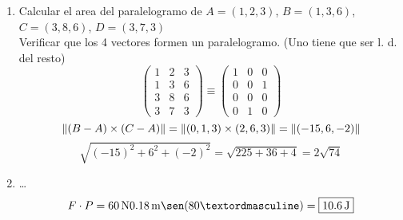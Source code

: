 \documentclass[../practica.root.tex]{subfiles}
\begin{document}
\begin{enumerate}
\begin{enumerate}
          \end{enumerate}

    \item Calcular el area del paralelogramo de $A = (1, 2, 3)$, $B = (1, 3, 6)$, $C = (3, 8, 6)$, $D = (3, 7 ,3)$ \\
          Verificar que los 4 vectores formen un paralelogramo. (Uno tiene que ser l. d. del resto) \\
          \[
              \begin{pmatrix}
                  1 & 2 & 3 \\
                  1 & 3 & 6 \\
                  3 & 8 & 6 \\
                  3 & 7 & 3
              \end{pmatrix}
              \equiv
              \begin{pmatrix}
                  1 & 0 & 0 \\
                  0 & 0 & 1 \\
                  0 & 0 & 0 \\
                  0 & 1 & 0
              \end{pmatrix}
          \]
          \[
              \|(B-A)\times(C-A)\| = \|(0, 1, 3)\times(2, 6, 3)\| = \|(-15, 6, -2)\|
          \] \[
              \sqrt{(-15)^2 + 6^2 + (-2)^2} = \sqrt{225 + 36 + 4} = \boxed{2\sqrt{74}}
          \]

    \item \dots
          \[F \cdot P = \SI{60}{\newton}\SI{0,18}{\m}\sen(80º) = \boxed{\SI{10,6}{\joule}} \]


\end{enumerate}
\end{document}
